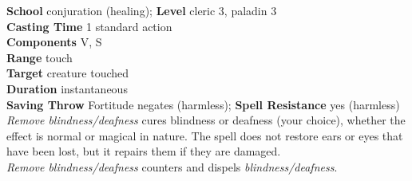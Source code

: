 \textbf{School} conjuration (healing); \textbf{Level} cleric 3, paladin 3\\
\textbf{Casting Time} 1 standard action\\
\textbf{Components} V, S\\
\textbf{Range} touch\\
\textbf{Target} creature touched\\
\textbf{Duration} instantaneous\\
\textbf{Saving Throw} Fortitude negates (harmless); \textbf{Spell Resistance} yes (harmless)\\
\textit{Remove blindness/deafness }cures blindness or deafness (your choice), whether the effect is normal or magical in nature. The spell does not restore ears or eyes that have been lost, but it repairs them if they are damaged.\\
\textit{Remove blindness/deafness} counters and dispels \textit{blindness/deafness}.\\

